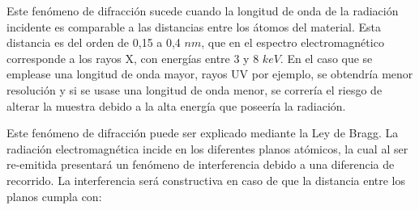 \documentclass[12pt]{article}
\theoremstyle{definition}
\theoremstyle{remark}
\begin{document}
 Este fenómeno de difracción sucede cuando la longitud de onda de la radiación incidente es comparable a las distancias entre los átomos del material. Esta distancia es del orden de 0,15 a 0,4 $nm$, que en el espectro electromagnético corresponde a los rayos X, con energías entre 3 y 8 $keV$. En el caso que se emplease una longitud de onda mayor, rayos UV por ejemplo, se obtendría menor resolución y si se usase una longitud de onda menor, se correría el riesgo de alterar la muestra debido a la alta energía que poseería la radiación.
 
 
 Este fenómeno de difracción puede ser explicado mediante la Ley de Bragg. La radiación electromagnética incide en los diferentes planos atómicos, la cual al ser re-emitida presentará un fenómeno de interferencia debido a una diferencia de recorrido. La interferencia será constructiva en caso de que la distancia entre los planos cumpla con:
 
\end{document}
